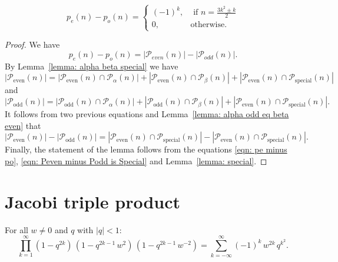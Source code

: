\begin{lemma}
$$p_e(n)-p_o(n)=
\begin{cases}(-1)^k,&\mbox{ if } n= \frac{3k^2\pm k}{2}\\
0, & \mbox{otherwise.}\end{cases}$$
\end{lemma}
\begin{proof}
We have
\begin{equation}\label{eqn: pe minus po}p_e(n)-p_o(n)=\left|\mathcal{P}_{even}(n)\right|-\left|\mathcal{P}_{odd}(n)\right|.\end{equation}
By Lemma~\ref{lemma: alpha beta special} we have
$$\left|\mathcal{P}_{\mathrm{even}}(n)\right|=\left|\mathcal{P}_{\mathrm{even}}(n)\cap \mathcal{P}_{\alpha}(n)\right|+\left|\mathcal{P}_{\mathrm{even}}(n) \cap \mathcal{P}_{\beta}(n)\right|+\left|\mathcal{P}_{\mathrm{even}}(n)\cap \mathcal{P}_{\mathrm{special}}(n)\right|$$
and
$$\left|\mathcal{P}_{\mathrm{odd}}(n)\right|=\left|\mathcal{P}_{\mathrm{odd}}(n)\cap \mathcal{P}_{\alpha}(n)\right|+\left|\mathcal{P}_{\mathrm{odd}}(n) \cap \mathcal{P}_{\beta}(n)\right|+\left|\mathcal{P}_{\mathrm{even}}(n)\cap \mathcal{P}_{\mathrm{special}}(n)\right|.$$
It follows from two previous equations and Lemma~\ref{lemma: alpha odd eq beta even} that
\begin{equation}\label{eqn: Peven minus Podd is Special}\left|\mathcal{P}_{\mathrm{even}}(n)\right|-\left|\mathcal{P}_{\mathrm{odd}}(n)\right| =\left|\mathcal{P}_{\mathrm{even}}(n)\cap \mathcal{P}_{\mathrm{special}}(n)\right|-\left|\mathcal{P}_{\mathrm{even}}(n)\cap \mathcal{P}_{\mathrm{special}}(n)\right|.\end{equation}
Finally, the statement of the lemma follows from the equations \eqref{eqn: pe minus po}, \eqref{eqn: Peven minus Podd is Special} and Lemma~\ref{lemma: special}.
\end{proof}

\section{Jacobi triple product}
\begin{theorem}
For all $w\neq 0$ and $q$ with $|q|<1$:
$$\prod_{k=1}^\infty (1-q^{2k})\,(1-q^{2k-1}\,w^2)\,(1-q^{2k-1}\,w^{-2})=\sum_{k=-\infty}^\infty (-1)^k\,w^{2k}\,q^{k^2}.$$
\end{theorem}


